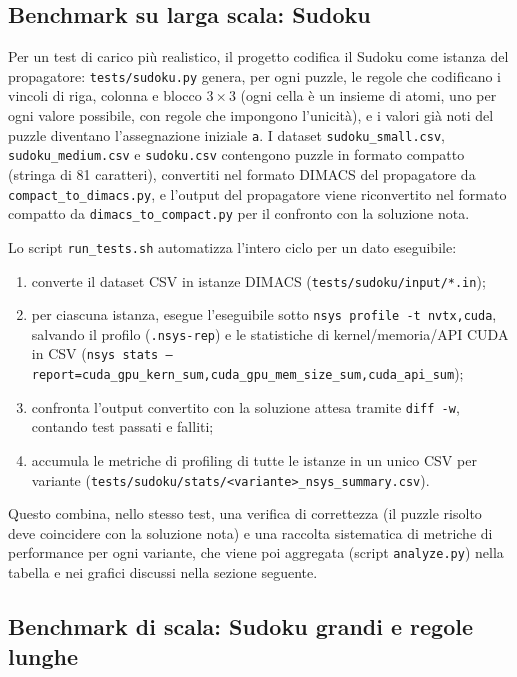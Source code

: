 \documentclass[11pt,a4paper]{article}
\begin{document}
\subsection{Benchmark su larga scala: Sudoku}

Per un test di carico più realistico, il progetto codifica il Sudoku come istanza del propagatore:
\texttt{tests/sudoku.py} genera, per ogni puzzle, le regole che codificano i vincoli di riga,
colonna e blocco $3\times3$ (ogni cella è un insieme di atomi, uno per ogni valore possibile, con
regole che impongono l'unicità), e i valori già noti del puzzle diventano l'assegnazione iniziale
\texttt{a}. I dataset \texttt{sudoku\_small.csv}, \texttt{sudoku\_medium.csv} e \texttt{sudoku.csv}
contengono puzzle in formato compatto (stringa di 81 caratteri), convertiti nel formato DIMACS del
propagatore da \texttt{compact\_to\_dimacs.py}, e l'output del propagatore viene riconvertito nel
formato compatto da \texttt{dimacs\_to\_compact.py} per il confronto con la soluzione nota.

Lo script \texttt{run\_tests.sh} automatizza l'intero ciclo per un dato eseguibile:

\begin{enumerate}
\item converte il dataset CSV in istanze DIMACS (\texttt{tests/sudoku/input/*.in});
\item per ciascuna istanza, esegue l'eseguibile sotto \texttt{nsys profile -t nvtx,cuda}, salvando
il profilo (\texttt{.nsys-rep}) e le statistiche di kernel/memoria/API CUDA in CSV
(\texttt{nsys stats --report=cuda\_gpu\_kern\_sum,cuda\_gpu\_mem\_size\_sum,cuda\_api\_sum});
\item confronta l'output convertito con la soluzione attesa tramite \texttt{diff -w}, contando
test passati e falliti;
\item accumula le metriche di profiling di tutte le istanze in un unico CSV per variante
(\texttt{tests/sudoku/stats/<variante>\_nsys\_summary.csv}).
\end{enumerate}

Questo combina, nello stesso test, una verifica di correttezza (il puzzle risolto deve coincidere
con la soluzione nota) e una raccolta sistematica di metriche di performance per ogni variante, che
viene poi aggregata (script \texttt{analyze.py}) nella tabella e nei grafici discussi nella sezione
seguente.

\subsection{Benchmark di scala: Sudoku grandi e regole lunghe}
\label{sec:scaling}
\end{document}
